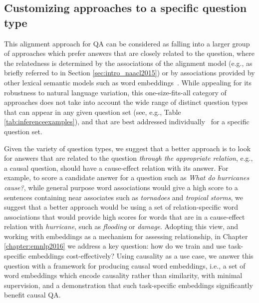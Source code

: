 \subsection{Customizing approaches to a specific question type}
\label{sec:intro_emnlp2016}

This alignment approach for QA can be considered as falling into a larger group of approaches which prefer answers that are closely related to the question, where the relatedness is determined by the associations of the alignment model (e.g., as briefly referred to in Section \ref{sec:intro_naacl2015}) or by associations provided by other lexical semantic models such as word embeddings~\citep{yih13,jansen14,fried2015higher}. 
While appealing for its robustness to natural language variation, this one-size-fits-all category of approaches does not take into account the wide range of distinct question types that can appear in any given question set (see, e.g.,  Table \ref{tab:inferenceexamples}), and that are best addressed individually~\citep{chu2004ibm,ferrucci2010building,clark2013study} for a specific question set.  

Given the variety of question types, we suggest that a better approach is to look for answers that are related to the question \emph{through the appropriate relation}, e.g., a causal question, should have a cause-effect relation with its answer.  For example, to score a candidate answer for a question such as \emph{What do hurricanes cause?}, while general purpose word associations would give a high score to a sentences containing near associates such as \emph{tornadoes} and \emph{tropical storms}, we suggest that a better approach would be using a set of relation-specific word associations that would provide high scores for words that are in a cause-effect relation with \emph{hurricane}, such as \emph{flooding} or \emph{damage}.
Adopting this view, and working with embeddings as a mechanism for assessing relationship, in Chapter \ref{chapter:emnlp2016} we address a key question: how do we train and use task-specific embeddings cost-effectively? 
Using causality as a use case, we answer this question with a framework for producing causal word embeddings, i.e., a set of word embeddings which encode causality rather than similarity, with minimal supervision, and a demonstration that such task-specific embeddings significantly benefit causal QA. 

